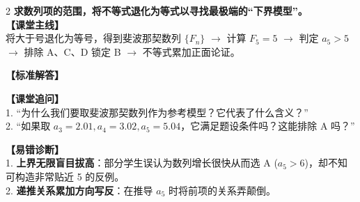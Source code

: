\documentclass[11pt,a4paper]{ctexart}
\begin{document}
\begin{paracol}{2}
  \textbf{求数列项的范围，将不等式退化为等式以寻找最极端的“下界模型”。}\\
  
  \textbf{【课堂主线】}\\
  将大于号退化为等号，得到斐波那契数列 \(\{F_n\}\) \(\to\) 计算 \(F_5 = 5\) \(\to\) 判定 \(a_5 > 5\) \(\to\) 排除 A、C、D 锁定 B \(\to\) 不等式累加正面论证。
  
  \textbf{【标准解答】}\\
  \qEightSolution
  
  \textbf{【课堂追问】}\\
  1. “为什么我们要取斐波那契数列作为参考模型？它代表了什么含义？”\\
  2. “如果取 \(a_3=2.01, a_4=3.02, a_5=5.04\)，它满足题设条件吗？这能排除 A 吗？”
  
  \switchcolumn
  \textbf{【易错诊断】}\\
  1. \textbf{上界无限盲目拔高}：部分学生误认为数列增长很快从而选 A (\(a_5>6\))，却不知可构造非常贴近 5 的反例。\\
  2. \textbf{递推关系累加方向写反}：在推导 \(a_5\) 时将前项的关系弄颠倒。
\end{paracol}

\vspace{0.8em}
\par{}
\vspace{0.8em}

\newpage

{\small
\qSixStem
}
\end{document}

